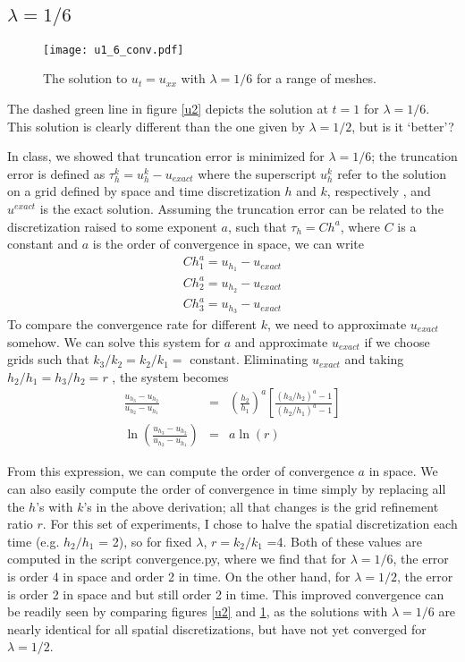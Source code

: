 \documentclass[11pt]{amsart}
\begin{document}
\subsection{$\lambda = 1/6$} 

\begin{figure}[t]
\begin{center} 
\texttt{[image: u1\_6\_conv.pdf]}
\caption{The solution to $u_t = u_{xx}$ with  $\lambda =1/6$ for a range of meshes.  }
\label{u16} 
\end{center}
\end{figure}

The dashed green line in figure \ref{u2} depicts the solution at $t=1$ for $\lambda =1/6$. This solution is clearly different than the one given by $\lambda =1/2$, but is it `better'? 

In class, we showed that truncation error is minimized for $\lambda = 1/6$;  the truncation error is defined as $\tau^k_h = u^{k}_h - u_{exact}$ where the superscript $u_h^k$ refer to the solution on a grid defined by space and  time discretization $h$ and $k$, respectively , and $u^{exact}$ is the exact solution. Assuming the truncation error can be related to the discretization raised to some exponent $a$, such that $\tau_h = Ch^a$, where $C$ is a constant and $a$ is the order of convergence in space, we can write  
\begin{eqnarray} 
Ch_1^a = u_{h_1} - u_{exact}\\
Ch_2^a= u_{h_2} - u_{exact}\\
Ch_3^a = u_{h_3} - u_{exact}
\end{eqnarray} 
To compare the convergence rate for different $k$, we need to approximate $u_{exact}$ somehow. We can solve this system for $a$ and approximate $u_{exact}$ if we choose grids such that $k_3/k_2 = k_2/k_1 =$ constant. Eliminating $u_{exact}$ and taking $h_2/h_1 = h_3/h_2 = r$ , the system becomes
\begin{eqnarray} 
\frac{u_{h_3}-u_{h_2}}{u_{h_2}-u_{h_1}} &=& \left(\frac{h_2}{h_1}\right)^a \left[\frac{(h_3/h_2)^a -1}{(h_2/h_1)^a-1}\right]\\
\ln\left( \frac{u_{h_3}-u_{h_2}}{u_{h_2}-u_{h_1}}\right) &=&  a \ln \left(r\right)
\end{eqnarray} 

From this expression, we can compute the order of convergence $a$ in space. 
We can also easily compute the order of convergence in time simply by replacing all the $h$'s with $k$'s in the above derivation; all that changes is the grid refinement ratio $r$. For this set of experiments, I chose to halve the spatial discretization each time (e.g. $h_2/h_1$ = 2), so for fixed $\lambda$,  $r =k_2/k_1$ =4. Both of these values are computed in the script convergence.py, where we find that for $\lambda = 1/6$, the error is order 4 in space and order 2 in time. On the other hand, for $\lambda =1/2$,   the error is order 2 in space and  but still order 2 in time. This improved convergence can be readily seen by comparing figures \ref{u2} and \ref{u16}, as the solutions with $\lambda =1/6$ are nearly identical for all spatial discretizations, but have not yet converged for $\lambda = 1/2$.
\end{document}
